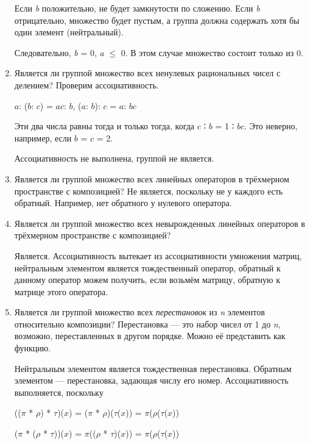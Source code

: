 \documentclass[12pt]{article}
\begin{document}
\begin{enumerate}
          Если \emph{b} положительно, не будет замкнутости по сложению. Если
          \emph{b} отрицательно, множество будет пустым, а группа должна содержать
          хотя бы один элемент (нейтральный).

          Следовательно, \emph{b} = 0, \emph{a} $\leq$ 0. В этом случае множество
          состоит только из 0.

    \item
          Является ли группой множество всех ненулевых рациональных чисел с
          делением? Проверим ассоциативность.

          $a$: ($b$: $c$) = $a$$c$: $b$, ($a$: $b$): $c$ = $a$: $b$$c$

              Эти два числа равны тогда и только тогда, когда $c$ ∶ $b$ = 1 ∶ $b$$c$. Это
              неверно, например, если $b$ = $c$ = 2.

          Ассоциативность не выполнена, группой не является.

    \item
          Является ли группой множество всех линейных операторов в трёхмерном
          пространстве с композицией? Не является, поскольку не у каждого есть
          обратный. Например, нет обратного у нулевого оператора.
    \item
          Является ли группой множество всех невырожденных линейных операторов в
          трёхмерном пространстве с композицией?

          Является. Ассоциативность вытекает из ассоциативности умножения матриц,
          нейтральным элементом является тождественный оператор, обратный к
          данному оператор можем получить, если возьмём матрицу, обратную к
          матрице этого оператора.

    \item
          Является ли группой множество всех \emph{перестановок} из \emph{n}
          элементов относительно композиции? Перестановка --- это набор чисел от
          1 до \emph{n}, возможно, переставленных в другом порядке. Можно её
          представить как функцию.

          Нейтральным элементом является тождественная перестановка. Обратным
          элементом --- перестановка, задающая числу его номер. Ассоциативность
          выполняется, поскольку

          (($\pi$ * $\rho$) * $\tau$)($x$) = ($\pi$ * $\rho$)($\tau$($x$)) = $\pi$($\rho$($\tau$($x$))

          ($\pi$ * ($\rho$ * $\tau$))($x$) = $\pi$(($\rho$ * $\tau$)($x$)) = $\pi$($\rho$($\tau$($x$))


\end{enumerate}
\end{document}
